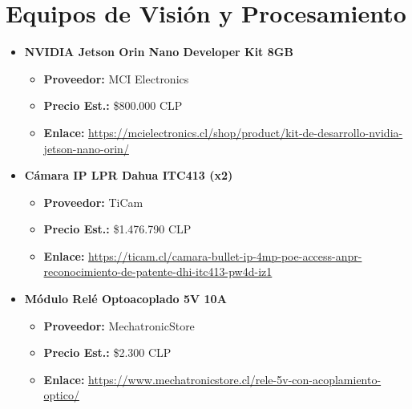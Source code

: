 \section{Equipos de Visión y Procesamiento}
\begin{itemize}
    \item \textbf{NVIDIA Jetson Orin Nano Developer Kit 8GB}
    \begin{itemize}
        \item \textbf{Proveedor:} MCI Electronics
        \item \textbf{Precio Est.:} \$800.000 CLP
        \item \textbf{Enlace:} \url{https://mcielectronics.cl/shop/product/kit-de-desarrollo-nvidia-jetson-nano-orin/}
    \end{itemize}
    
    \item \textbf{Cámara IP LPR Dahua ITC413 (x2)}
    \begin{itemize}
        \item \textbf{Proveedor:} TiCam
        \item \textbf{Precio Est.:} \$1.476.790 CLP
        \item \textbf{Enlace:} \url{https://ticam.cl/camara-bullet-ip-4mp-poe-access-anpr-reconocimiento-de-patente-dhi-itc413-pw4d-iz1}
    \end{itemize}
    
    \item \textbf{Módulo Relé Optoacoplado 5V 10A}
    \begin{itemize}
        \item \textbf{Proveedor:} MechatronicStore
        \item \textbf{Precio Est.:} \$2.300 CLP
        \item \textbf{Enlace:} \url{https://www.mechatronicstore.cl/rele-5v-con-acoplamiento-optico/}
    \end{itemize}
\end{itemize}


